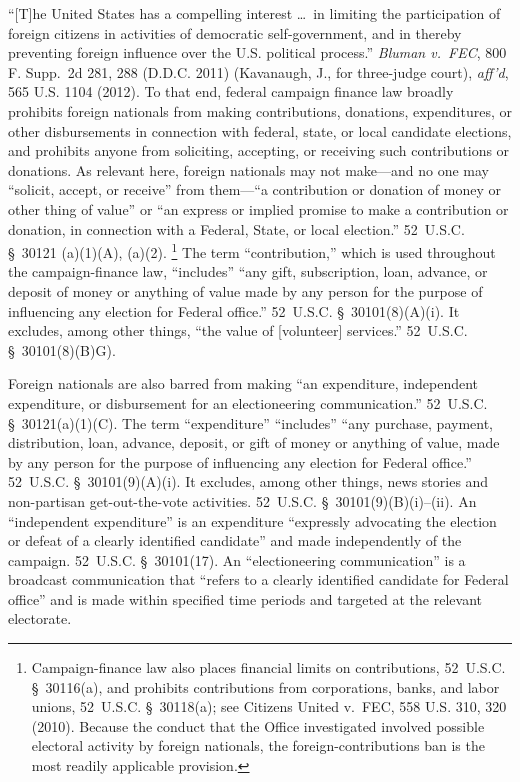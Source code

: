 ``[T]he United States has a compelling interest \dots\ in limiting the participation of foreign citizens in activities of democratic self-government, and in thereby preventing foreign influence over the U.S. political process.''
\textit{Bluman v.\ FEC}, 800 F. Supp.~2d 281, 288 (D.D.C. 2011) (Kavanaugh, J., for three-judge court), \textit{aff'd}, 565 U.S. 1104 (2012).
To that end, federal campaign finance law broadly prohibits foreign nationals from making contributions, donations, expenditures, or other disbursements in connection with federal, state, or local candidate elections, and prohibits anyone from soliciting, accepting, or receiving such contributions or donations.
As relevant here, foreign nationals may not make---and no one may ``solicit, accept, or receive'' from them---``a contribution or donation of money or other thing of value'' or ``an express or implied promise to make a contribution or donation, in connection with a Federal, State, or local election.''
52~U.S.C. \S~30121 (a)(1)(A), (a)(2).%
\footnote{Campaign-finance law also places financial limits on contributions, 52~U.S.C. \S~30116(a), and prohibits contributions from corporations, banks, and labor unions, 52~U.S.C. \S~30118(a);
see Citizens United v.\ FEC, 558 U.S. 310, 320 (2010).
Because the conduct that the Office investigated involved possible electoral activity by foreign nationals, the foreign-contributions ban is the most readily applicable provision.}
The term ``contribution,'' which is used throughout the campaign-finance law, ``includes'' ``any gift, subscription, loan, advance, or deposit of money or anything of value made by any person for the purpose of influencing any election for Federal office.''
52~U.S.C. \S~30101(8)(A)(i).
It excludes, among other things, ``the value of [volunteer] services.'' 52~U.S.C. \S~30101(8)(B)G).

Foreign nationals are also barred from making ``an expenditure, independent expenditure, or disbursement for an electioneering communication.''
52~U.S.C. \S~30121(a)(1)(C).
The term ``expenditure'' ``includes'' ``any purchase, payment, distribution, loan, advance, deposit, or gift of money or anything of value, made by any person for the purpose of influencing any election for Federal office.''
52~U.S.C. \S~30101(9)(A)(i).
It excludes, among other things, news stories and non-partisan get-out-the-vote activities.
52~U.S.C. \S~30101(9)(B)(i)--(ii).
An ``independent expenditure'' is an expenditure ``expressly advocating the election or defeat of a clearly identified candidate'' and made independently of the campaign.
52~U.S.C. \S~30101(17).
An ``electioneering communication'' is a broadcast communication that ``refers to a clearly identified candidate for Federal office'' and is made within specified time periods and targeted at the relevant electorate.

